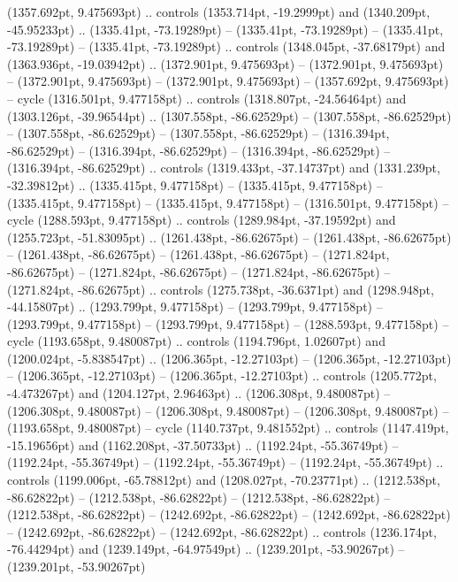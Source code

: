 (1357.692pt, 9.475693pt) .. controls (1353.714pt, -19.2999pt) and (1340.209pt, -45.95233pt) .. (1335.41pt, -73.19289pt)
 -- (1335.41pt, -73.19289pt)
 -- (1335.41pt, -73.19289pt)
 -- (1335.41pt, -73.19289pt) .. controls (1348.045pt, -37.68179pt) and (1363.936pt, -19.03942pt) .. (1372.901pt, 9.475693pt)
 -- (1372.901pt, 9.475693pt)
 -- (1372.901pt, 9.475693pt)
 -- (1372.901pt, 9.475693pt)
 -- (1357.692pt, 9.475693pt) -- cycle
(1316.501pt, 9.477158pt) .. controls (1318.807pt, -24.56464pt) and (1303.126pt, -39.96544pt) .. (1307.558pt, -86.62529pt)
 -- (1307.558pt, -86.62529pt)
 -- (1307.558pt, -86.62529pt)
 -- (1307.558pt, -86.62529pt)
 -- (1316.394pt, -86.62529pt)
 -- (1316.394pt, -86.62529pt)
 -- (1316.394pt, -86.62529pt)
 -- (1316.394pt, -86.62529pt) .. controls (1319.433pt, -37.14737pt) and (1331.239pt, -32.39812pt) .. (1335.415pt, 9.477158pt)
 -- (1335.415pt, 9.477158pt)
 -- (1335.415pt, 9.477158pt)
 -- (1335.415pt, 9.477158pt)
 -- (1316.501pt, 9.477158pt) -- cycle
(1288.593pt, 9.477158pt) .. controls (1289.984pt, -37.19592pt) and (1255.723pt, -51.83095pt) .. (1261.438pt, -86.62675pt)
 -- (1261.438pt, -86.62675pt)
 -- (1261.438pt, -86.62675pt)
 -- (1261.438pt, -86.62675pt)
 -- (1271.824pt, -86.62675pt)
 -- (1271.824pt, -86.62675pt)
 -- (1271.824pt, -86.62675pt)
 -- (1271.824pt, -86.62675pt) .. controls (1275.738pt, -36.6371pt) and (1298.948pt, -44.15807pt) .. (1293.799pt, 9.477158pt)
 -- (1293.799pt, 9.477158pt)
 -- (1293.799pt, 9.477158pt)
 -- (1293.799pt, 9.477158pt)
 -- (1288.593pt, 9.477158pt) -- cycle
(1193.658pt, 9.480087pt) .. controls (1194.796pt, 1.02607pt) and (1200.024pt, -5.838547pt) .. (1206.365pt, -12.27103pt)
 -- (1206.365pt, -12.27103pt)
 -- (1206.365pt, -12.27103pt)
 -- (1206.365pt, -12.27103pt) .. controls (1205.772pt, -4.473267pt) and (1204.127pt, 2.96463pt) .. (1206.308pt, 9.480087pt)
 -- (1206.308pt, 9.480087pt)
 -- (1206.308pt, 9.480087pt)
 -- (1206.308pt, 9.480087pt)
 -- (1193.658pt, 9.480087pt) -- cycle
(1140.737pt, 9.481552pt) .. controls (1147.419pt, -15.19656pt) and (1162.208pt, -37.50733pt) .. (1192.24pt, -55.36749pt)
 -- (1192.24pt, -55.36749pt)
 -- (1192.24pt, -55.36749pt)
 -- (1192.24pt, -55.36749pt) .. controls (1199.006pt, -65.78812pt) and (1208.027pt, -70.23771pt) .. (1212.538pt, -86.62822pt)
 -- (1212.538pt, -86.62822pt)
 -- (1212.538pt, -86.62822pt)
 -- (1212.538pt, -86.62822pt)
 -- (1242.692pt, -86.62822pt)
 -- (1242.692pt, -86.62822pt)
 -- (1242.692pt, -86.62822pt)
 -- (1242.692pt, -86.62822pt) .. controls (1236.174pt, -76.44294pt) and (1239.149pt, -64.97549pt) .. (1239.201pt, -53.90267pt)
 -- (1239.201pt, -53.90267pt)
